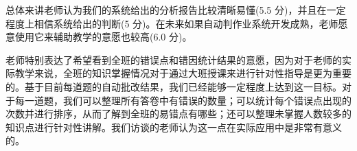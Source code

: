 总体来讲老师认为我们的系统给出的分析报告比较清晰易懂(5.5 分)，并且在一定程度上相信系统给出的判断(5 分)。在未来如果自动判作业系统开发成熟，老师愿意使用它来辅助教学的意愿也较高(6.0 分)。

老师特别表达了希望看到全班的错误点和错因统计结果的意愿，因为对于老师的实际教学来说，全班的知识掌握情况对于通过大班授课来进行针对性指导是更为重要的。基于目前每道题的自动批改结果，我们已经能够一定程度上达到这一目标。对于每一道题，我们可以整理所有答卷中有错误的数量；可以统计每个错误点出现的次数并进行排序，从而了解到全班的易错点有哪些；还可以整理未掌握人数较多的知识点进行针对性讲解。我们访谈的老师认为这一点在实际应用中是非常有意义的。

